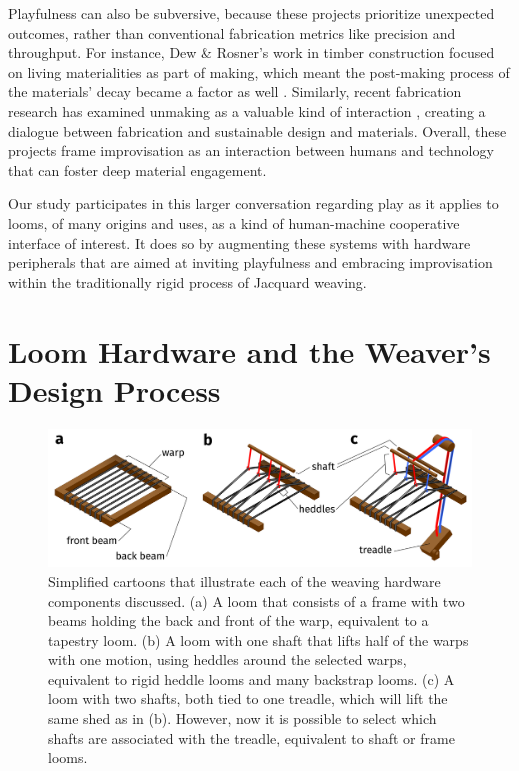 Playfulness can also be subversive, because these projects prioritize unexpected outcomes, rather than conventional fabrication metrics like precision and throughput. For instance, Dew \& Rosner's work in timber construction focused on living materialities as part of making, which meant the post-making process of the materials' decay became a factor as well \cite{dew_lessons_2018}. Similarly, recent fabrication research has examined unmaking as a valuable kind of interaction \cite{song_unmaking_2021}, creating a dialogue between fabrication and sustainable design and materials. Overall, these projects frame improvisation as an interaction between humans and technology that can foster deep material engagement. 

Our study participates in this larger conversation regarding play as it applies to looms, of many origins and uses, as a kind of human-machine cooperative interface of interest. It does so by augmenting these systems with hardware peripherals that are aimed at inviting playfulness and embracing improvisation within the traditionally rigid process of Jacquard weaving.

\section{Loom Hardware and the Weaver's Design Process}
\label{sect_bg-looms}

\begin{figure}[h]
  \centering
  \includegraphics[width=\linewidth]{figs/LP_2_loom-parts.png}
  \caption[Illustrations of different hardware components of weaving looms.]{Simplified cartoons that illustrate each of the weaving hardware components discussed. (a) A loom that consists of a frame with two beams holding the back and front of the warp, equivalent to a tapestry loom. (b) A loom with one shaft that lifts half of the warps with one motion, using heddles around the selected warps, equivalent to rigid heddle looms and many backstrap looms. (c) A loom with two shafts, both tied to one treadle, which will lift the same shed as in (b). However, now it is possible to select which shafts are associated with the treadle, equivalent to shaft or frame looms.}
  \label{fig:loom-parts}
\end{figure}

